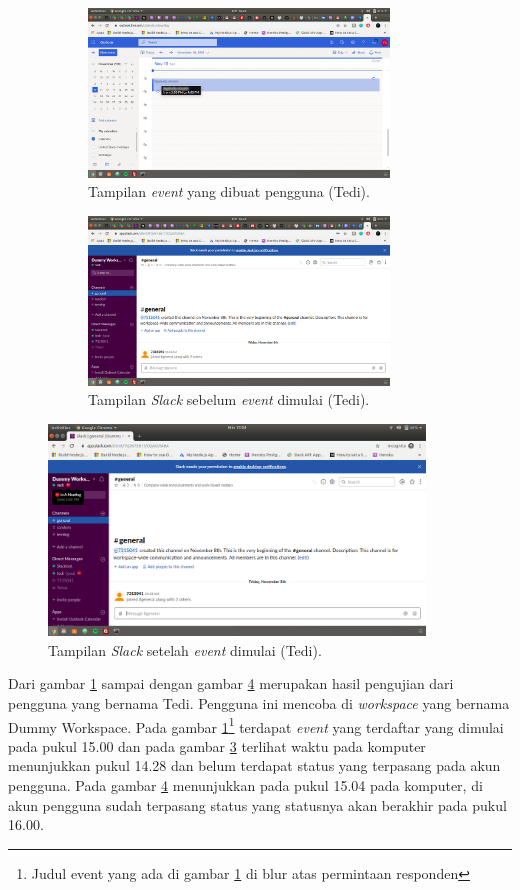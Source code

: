 \begin{figure}[h]
\begin{subfigure}{8.5cm}
  \centering
  \includegraphics[width=8cm]{./Gambar/PengujianTedi/Outlook.png}
  \caption{Tampilan \textit{event} yang dibuat pengguna (Tedi).}
  \label{fig:outlook_tedi}
\end{subfigure}
\begin{subfigure}{8.5cm}
  \centering
  \includegraphics[width=8cm]{./Gambar/PengujianTedi/Slack_Before.png}
  \caption{Tampilan \textit{Slack} sebelum \textit{event} dimulai (Tedi).}
  \label{fig:slack_before_tedi}
\end{subfigure}
\caption{}
\end{figure}

\begin{figure}[h]
  \includegraphics[width=10cm]{./Gambar/PengujianTedi/Slack_After.png}
  \centering
  \caption{Tampilan \textit{Slack} setelah \textit{event} dimulai (Tedi).}
  \label{fig:slack_after_tedi}
\end{figure}

Dari gambar \ref{fig:outlook_tedi} sampai dengan gambar \ref{fig:slack_after_tedi} merupakan hasil pengujian dari pengguna yang bernama Tedi. Pengguna ini mencoba di \textit{workspace} yang bernama Dummy Workspace. Pada gambar \ref{fig:outlook_tedi}\footnote{Judul event yang ada di gambar \ref{fig:outlook_tedi} di blur atas permintaan responden} terdapat \textit{event} yang terdaftar yang dimulai pada pukul 15.00 dan pada gambar \ref{fig:slack_before_tedi} terlihat waktu pada komputer menunjukkan pukul 14.28 dan belum terdapat status yang terpasang pada akun pengguna. Pada gambar \ref{fig:slack_after_tedi} menunjukkan pada pukul 15.04 pada komputer, di akun pengguna sudah terpasang status yang statusnya akan berakhir pada pukul 16.00. 

